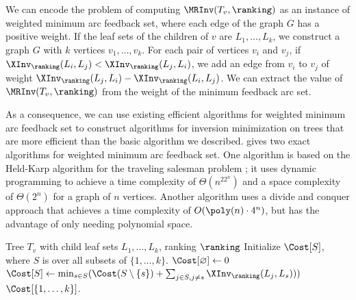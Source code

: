 \documentclass{toc}
\begin{document}
We can encode the problem of computing $\MRInv(T_v,\ranking)$ as an instance of weighted minimum arc feedback set, where each edge of the graph $G$ has a positive weight. If the leaf sets of the children of $v$ are $L_1,\dots,L_k$, we construct a graph $G$ with $k$ vertices $v_1,\dots,v_k$. For each pair of vertices $v_i$ and $v_j$, if $\XInv_\ranking(L_i,L_j)<\XInv_\ranking(L_j,L_i)$, we add an edge from $v_i$ to $v_j$ of weight $\XInv_\ranking(L_j,L_i)-\XInv_\ranking(L_i,L_j)$. We can extract the value of $\MRInv(T_v,\ranking)$ from the weight of the minimum feedback arc set.

As a consequence, we can use existing efficient algorithms for weighted minimum arc feedback set to construct algorithms for inversion minimization on trees that are more efficient than the basic algorithm we described. \cite{Bodlaender2011} gives two exact algorithms for weighted minimum arc feedback set. One algorithm {\cite[Algorithm 1]{Bodlaender2011}} is based on the Held-Karp algorithm for the traveling salesman problem \cite{HK62}; it uses dynamic programming to achieve a time complexity of $\Theta(n^22^n)$ and a space complexity of $\Theta(2^n)$ for a graph of $n$ vertices. Another algorithm {\cite[Algorithm 2]{Bodlaender2011}} uses a divide and conquer approach that achieves a time complexity of $O(\poly(n)\cdot 4^n)$, but has the advantage of only needing polynomial space.

%
%

\begin{algorithm}[ht]
    \caption{$\MRInv(T_v, \ranking)$, Dynamic Programming}\label{alg:MRInv-DP}
    \begin{algorithmic}
        \Require Tree $T_v$ with child leaf sets $L_1,\dots,L_k$, ranking $\ranking$
        \State Initialize $\Cost[S]$, where $S$ is over all subsets of $\{1,\dots,k\}$.
        \State $\Cost[\varnothing]\gets 0$
                \State $\Cost[S]\gets \min_{s\in S} (\Cost(S\setminus \{s\}) + \sum_{j\in S, j\neq s} \XInv_\ranking(L_{j}, L_{s})))$
            \EndFor
        \EndFor
        \State \Return $\Cost[\{1,\dots,k\}]$.
    \end{algorithmic}
\end{algorithm}
\end{document}
